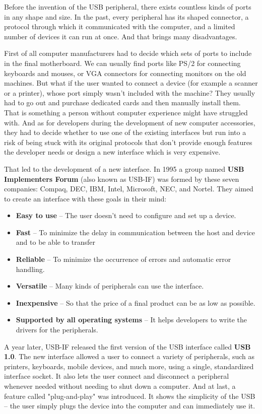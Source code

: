 Before the invention of the USB peripheral, there exists countless kinds of ports in any shape and size. In the past, every peripheral has its shaped connector, a protocol through which it communicated with the computer, and a limited number of devices it can run at once. And that brings many disadvantages.

First of all computer manufacturers had to decide which sets of ports to include in the final motherboard. We can usually find ports like PS/2 for connecting keyboards and mouses, or VGA connectors for connecting monitors on the old machines. But what if the user wanted to connect a device (for example a scanner or a printer), whose port simply wasn't included with the machine? They usually had to go out and purchase dedicated cards and then manually install them. That is something a person without computer experience might have struggled with. And as for developers during the development of new computer accessories, they had to decide whether to use one of the existing interfaces but run into a risk of being stuck with its original protocols that don't provide enough features the developer needs or design a new interface which is very expensive.

That led to the development of a new interface. In 1995 a group named \textbf{USB Implementers Forum} (also known as USB-IF) was formed by these seven companies: Compaq, DEC, IBM, Intel, Microsoft, NEC, and Nortel. They aimed to create an interface with these goals in their mind:
\begin{itemize}
    \item \textbf{Easy to use} \--- The user doesn't need to configure and set up a device.
    \item \textbf{Fast} \--- To minimize the delay in communication between the host and device and to be able to transfer
    \item \textbf{Reliable} \--- To minimize the occurrence of errors and automatic error handling.
    \item \textbf{Versatile} \--- Many kinds of peripherals can use the interface.
    \item \textbf{Inexpensive} \--- So that the price of a final product can be as low as possible.
    \item \textbf{Supported by all operating systems} \--- It helps developers to write the drivers for the peripherals.
\end{itemize}

A year later, USB-IF released the first version of the USB interface called \textbf{USB 1.0}. The new interface allowed a user to connect a variety of peripherals, such as printers, keyboards, mobile devices, and much more, using a single, standardized interface socket. It also lets the user connect and disconnect a peripheral whenever needed without needing to shut down a computer. And at last, a feature called "plug-and-play" was introduced. It shows the simplicity of the USB \--- the user simply plugs the device into the computer and can immediately use it.

